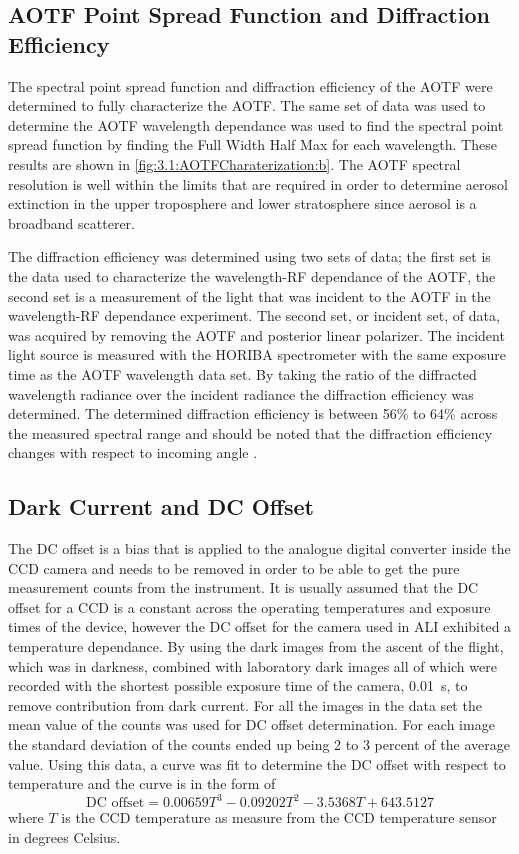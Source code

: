 \documentclass[12pt]{article}
\begin{document}
\subsection{AOTF Point Spread Function and Diffraction Efficiency}

The spectral point spread function and diffraction efficiency of the AOTF were determined to fully characterize the AOTF. The same set of data was used to determine the AOTF wavelength dependance was used to find the spectral point spread function by finding the Full Width Half Max for each wavelength. These results are shown in \autoref{fig:3.1:AOTFCharaterization:b}. The AOTF spectral resolution is well within the limits that are required in order to determine aerosol extinction in the upper troposphere and lower stratosphere since aerosol is a broadband scatterer.

The diffraction efficiency was determined using two sets of data; the first set is the data used to characterize the wavelength-RF dependance of the AOTF, the second set is a measurement of the light that was incident to the AOTF in the wavelength-RF dependance experiment. The second set, or incident set, of data, was acquired by removing the AOTF and posterior linear polarizer. The incident light source is measured with the HORIBA spectrometer with the same exposure time as the AOTF wavelength data set. By taking the ratio of the diffracted wavelength radiance over the incident radiance the diffraction efficiency was determined. The determined diffraction efficiency is between 56\% to 64\% across the measured spectral range and should be noted that the diffraction efficiency changes with respect to incoming angle \citep{Xu1992}.

\subsection{Dark Current and DC Offset}

The DC offset is a bias that is applied to the analogue digital converter inside the CCD camera and needs to be removed in order to be able to get the pure measurement counts from the instrument. It is usually assumed that the DC offset for a CCD is a constant across the operating temperatures and exposure times of the device, however the DC offset for the camera used in ALI exhibited a temperature dependance. By using the dark images from the ascent of the flight, which was in darkness, combined with laboratory dark images all of which were recorded with the shortest possible exposure time of the camera, 0.01~s, to remove contribution from dark current. For all the images in the data set the mean value of the counts was used for DC offset determination. For each image the standard deviation of the counts ended up being 2 to 3 percent of the average value. Using this data, a curve was fit to determine the DC offset with respect to temperature and the curve is in the form of
\begin{equation}
    \text{DC offset} = 0.00659T^{3}-0.09202T^{2}-3.5368T+643.5127
    \label{eqn:5.2:DcOffsetCurve}
\end{equation}
where $T$ is the CCD temperature as measure from the CCD temperature sensor in degrees Celsius.
\end{document}
